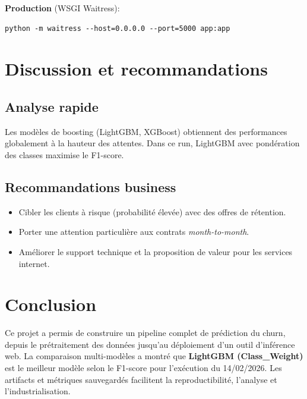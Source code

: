 \documentclass[11pt,a4paper]{article}
\begin{document}
\textbf{Production} (WSGI Waitress):
\begin{verbatim}
python -m waitress --host=0.0.0.0 --port=5000 app:app
\end{verbatim}

\section{Discussion et recommandations}
\subsection{Analyse rapide}
Les mod\`eles de boosting (LightGBM, XGBoost) obtiennent des performances globalement \`a la hauteur des attentes. Dans ce run, LightGBM avec pond\'eration des classes maximise le F1-score.

\subsection{Recommandations business}
\begin{itemize}
  \item Cibler les clients \`a risque (probabilit\'e \'elev\'ee) avec des offres de r\'etention.
  \item Porter une attention particuli\`ere aux contrats \emph{month-to-month}.
  \item Am\'eliorer le support technique et la proposition de valeur pour les services internet.
\end{itemize}

\section{Conclusion}
Ce projet a permis de construire un pipeline complet de pr\'ediction du churn, depuis le pr\'etraitement des donn\'ees jusqu'au d\'eploiement d'un outil d'inf\'erence web. La comparaison multi-mod\`eles a montr\'e que \textbf{LightGBM (Class\_Weight)} est le meilleur mod\`ele selon le F1-score pour l'ex\'ecution du 14/02/2026. Les artifacts et m\'etriques sauvegard\'es facilitent la reproductibilit\'e, l'analyse et l'industrialisation.
\end{document}
